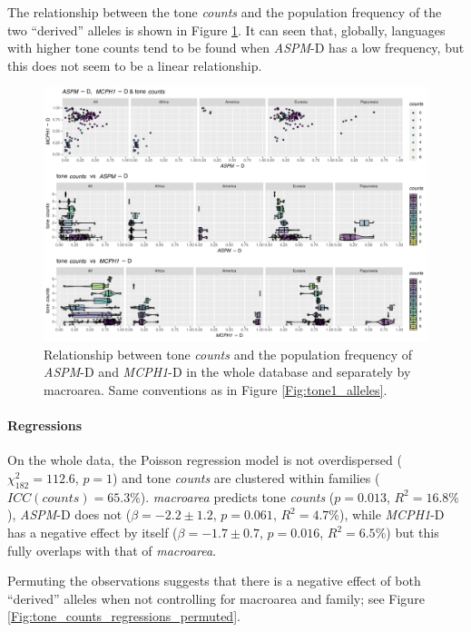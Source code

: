 \documentclass[twoside,onecolumn]{article}
\begin{document}
The relationship between the tone \textit{counts} and the population frequency of the two ``derived'' alleles is shown in Figure \ref{Fig:tone_counts_alleles}.
It can seen that, globally, languages with higher tone counts tend to be found when \textit{ASPM}-D has a low frequency, but this does not seem to be a linear relationship.

\begin{figure}[h]
  \centering
  \includegraphics[width=\textwidth]{../../code/figures/tone_counts_alleles}
  \caption{Relationship between tone \textit{counts} and the population frequency of \textit{ASPM}-D and \textit{MCPH1}-D in the whole database and separately by macroarea. Same conventions as in Figure \ref{Fig:tone1_alleles}.}
  \label{Fig:tone_counts_alleles}
\end{figure}


\paragraph{Regressions}

On the whole data, the Poisson regression model is not overdispersed ($\chi^2_{182} = 112.6$, $p = 1$) and tone \textit{counts} are clustered within families ($ICC(counts) = 65.3\%$).
\textit{macroarea} predicts tone \textit{counts} ($p = 0.013$, $R^2 = 16.8\%$), \textit{ASPM}-D does not ($\beta = -2.2 \pm 1.2$, $p = 0.061$, $R^2 = 4.7\%$), while \textit{MCPH1}-D has a negative effect by itself ($\beta = -1.7 \pm 0.7$, $p = 0.016$, $R^2 = 6.5\%$) but this fully overlaps with that of \textit{macroarea}.

Permuting the observations suggests that there is a negative effect of both ``derived'' alleles when not controlling for macroarea and family; see Figure \ref{Fig:tone_counts_regressions_permuted}.
\end{document}
